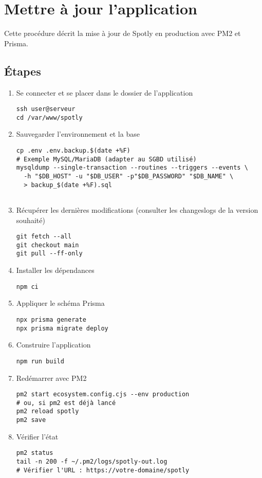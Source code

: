 \documentclass[a4paper,12pt]{article}
\begin{document}
\newpage

\section{Mettre à jour l'application}
\label{sec:update}

Cette procédure décrit la mise à jour de Spotly en production avec PM2 et Prisma.


\subsection*{Étapes}
\begin{enumerate}
  \item Se connecter et se placer dans le dossier de l'application
\begin{verbatim}
ssh user@serveur
cd /var/www/spotly
\end{verbatim}

  \item Sauvegarder l'environnement et la base
\begin{verbatim}
cp .env .env.backup.$(date +%F)
# Exemple MySQL/MariaDB (adapter au SGBD utilisé)
mysqldump --single-transaction --routines --triggers --events \
  -h "$DB_HOST" -u "$DB_USER" -p"$DB_PASSWORD" "$DB_NAME" \
  > backup_$(date +%F).sql
  
\end{verbatim}

  \item Récupérer les dernières modifications
  (consulter les changeslogs de la version souhaité)
\begin{verbatim}
git fetch --all
git checkout main
git pull --ff-only
\end{verbatim}

  \item Installer les dépendances
\begin{verbatim}
npm ci
\end{verbatim}

  \item Appliquer le schéma Prisma
\begin{verbatim}
npx prisma generate
npx prisma migrate deploy
\end{verbatim}

  \item Construire l'application
\begin{verbatim}
npm run build
\end{verbatim}

  \item Redémarrer avec PM2
\begin{verbatim}
pm2 start ecosystem.config.cjs --env production
# ou, si pm2 est déjà lancé
pm2 reload spotly
pm2 save
\end{verbatim}

  \item Vérifier l'état
\begin{verbatim}
pm2 status
tail -n 200 -f ~/.pm2/logs/spotly-out.log
# Vérifier l'URL : https://votre-domaine/spotly
\end{verbatim}
\end{enumerate}
\end{document}

